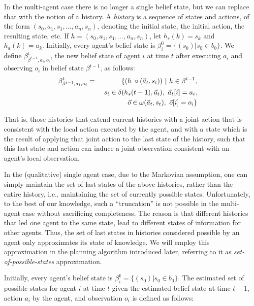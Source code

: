 \documentclass[letterpaper]{article}
\theoremstyle{definition}
\begin{document}
In the multi-agent case there is no longer a single belief state, but we can replace that with the notion of a history. A \emph{history} is a sequence of
states and actions, of the form $(s_0,a_1,s_1,\ldots,a_n,s_n)$, denoting the initial state, the initial action, the resulting state, etc.
If $h=(s_0,a_1,s_1,\ldots,a_n,s_n)$, let $h_s(k)= s_k$ and $h_a(k)=a_k$.
Initially, every agent's belief state is $\beta_i^0 = \{(s_0) | s_0 \in b_0\}.$
We define $\beta^t_{\beta^{t-1},a_i,o_i}$, the new belief state of agent $i$ at time $t$ after executing $a_i$ and observing $o_i$ in belief state $\beta^{t-1}$, as follows: \\[-12pt]

 \begin{eqnarray}
 \scriptsize
  \beta^t_{\beta^{t-1},a_i,o_i} & = & \{ (h\; \circ (\vec{a}_t,s_{t})) ~|~ h\in\beta^{t-1}, \\  \nonumber
&&~s_{t}\in\delta(h_s(t-1), \vec{a}_t),~\vec{a}_t[i] = a_i,\\  \nonumber
&& ~\vec{o} \in \omega(\vec{a}_t,s_{t}), ~\vec{o}[i] = o_i\}
\end{eqnarray}



That is, those histories that extend current histories with a joint action that is consistent with the local action executed by the agent, and
with a state which is the result of applying that joint action to the last state of the history, such that this last state and action can induce a
joint-observation consistent with an agent's local observation.

In the (qualitative) single agent case, due to the Markovian assumption, one can simply maintain the set of last states of the above histories, rather than the entire history, i.e., maintaining the set of currently possible states. Unfortunately, to the best of our knowledge, such a ``truncation'' is not possible in the multi-agent case without sacrificing completeness.
The reason is that different histories that led one agent to the same state, lead to different states of information for other agents. Thus, the set of last states in histories considered possible by an agent only approximates its state of knowledge.  We will employ this approximation in the planning algorithm introduced later, referring to it as {\em set-of-possible-states\/} approximation.

Initially, every agent's belief state is $\beta_i^0 = \{(s_0) | s_0 \in b_0\}$.  The estimated set of possible states for agent $i$ at time $t$ given the estimated belief state at time $t-1$, action $a_i$ by the agent, and observation $o_i$
is defined as follows: \\[-12pt]
\end{document}
